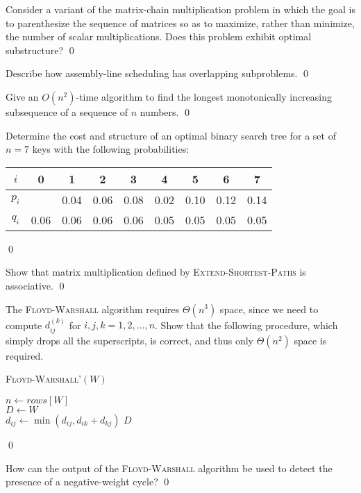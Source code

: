 Consider a variant of the matrix-chain multiplication problem in which the goal is to parenthesize the sequence of matrices so as to maximize, rather than minimize, the number of
scalar multiplications. Does this problem exhibit optimal substructure?
\answer
\todo
\qed

Describe how assembly-line scheduling has overlapping subproblems.
\answer
\todo
\qed

Give an $O(n^2)$-time algorithm to find the longest monotonically increasing subsequence of a sequence of $n$ numbers.
\answer
\todo
\qed

Determine the cost and structure of an optimal binary search tree for a set of $n=7$ keys with the following probabilities:
\begin{center}
\begin{tabular}{|c|cccccccc|}
\hline
$i$ & 0 & 1 & 2 & 3 & 4 & 5 & 6 & 7\\
\hline
$p_i$ & & 0.04 & 0.06 & 0.08 & 0.02 & 0.10 & 0.12 & 0.14\\
$q_i$ & 0.06 & 0.06 & 0.06 & 0.06 & 0.05 & 0.05 & 0.05 & 0.05\\
\hline
\end{tabular}
\end{center}
\answer
\todo
\qed

Show that matrix multiplication defined by \textsc{Extend-Shortest-Paths} is associative.
\answer
\todo
\qed

The \textsc{Floyd-Warshall} algorithm requires $\Theta(n^3)$ space, since we need to compute $d_{ij}^{(k)}$ for $i, j, k = 1, 2, \ldots, n$. Show that the following
procedure, which simply drops all the superscripts, is correct, and thus only $\Theta(n^2)$ space is required.

\begin{algorithm}[H]
\caption{\textsc{Floyd-Warshall'}$(W)$}
$n \leftarrow rows[W]$\\
$D \leftarrow W$\\
 {
   {
     {
      $d_{ij}\leftarrow \min(d_{ij}, d_{ik} + d_{kj})$
    }
  }
}
\Return $D$
\end{algorithm}
\answer
\todo
\qed

How can the output of the \textsc{Floyd-Warshall} algorithm be used to detect the presence of a negative-weight cycle?
\answer
\todo
\qed


